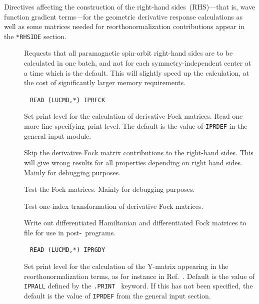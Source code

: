 Directives affecting the construction of the right-hand
sides~(RHS)---that is,
wave function gradient terms---for the geometric derivative response
calculations as well as some matrices needed for reorthonormalization
contributions appear in the \verb|*RHSIDE| section.

\begin{description}
\item[] Requests that all paramagnetic
spin-orbit
right-hand sides are to be calculated in one batch, and not for each
symmetry-independent center at a time which is the default. This will
slightly speed up the calculation, at the cost of significantly larger
memory requirements.

\item[]\verb| |\newline
\verb|READ (LUCMD,*) IPRFCK|

Set print level for the calculation of derivative Fock matrices.  Read
one more line specifying print level. The default  is the value of
\verb|IPRDEF| in the general input module.

\item[] Skip the derivative Fock matrix contributions
to the right-hand sides. This will give wrong results for all
properties depending on right hand sides. Mainly for debugging purposes.

\item[] Test the Fock matrices. Mainly for debugging
purposes.

\item[] Test one-index transformation of derivative
Fock matrices.

\item[] Write out differentiated Hamiltonian and
differentiated Fock matrices to file for use in post-\dalton\ programs.

\item[]\verb| |\newline
\verb|READ (LUCMD,*) IPRGDY|

Set print level for the calculation of the Y-matrix appearing in the
reorthonormalization terms, as for instance in
Ref.~\cite{tuhjahjajpjjcp84}. Default  is the value of \verb|IPRALL|
defined by the \verb|.PRINT | keyword. If
this has not been specified, the default is the value of \verb|IPRDEF|
from the general input section.


\end{description}
